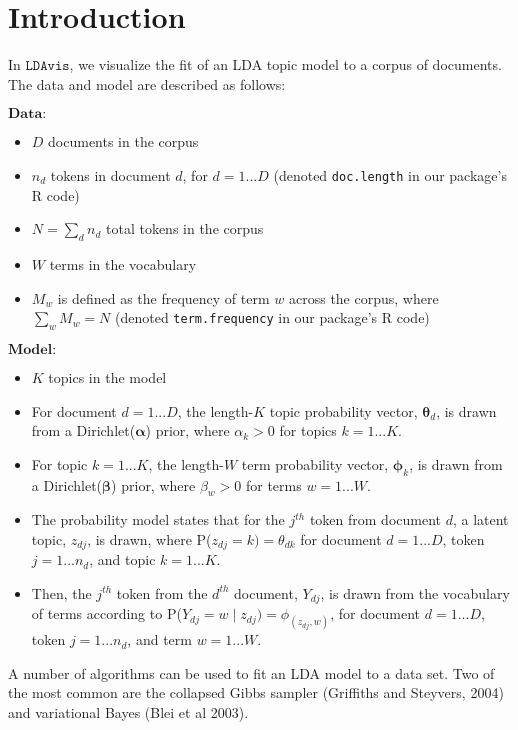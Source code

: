 \documentclass[12pt]{article}
\begin{document}



\section{Introduction}
In $\texttt{LDAvis}$, we visualize the fit of an LDA topic model to a corpus of documents. The data and model are described as follows:

$\textbf{Data:}$
\begin{itemize}
\item $D$ documents in the corpus
\item $n_d$ tokens in document $d$, for $d = 1...D$ (denoted \texttt{doc.length} in our package's R code)
\item $N = \sum_d n_d$ total tokens in the corpus
\item $W$ terms in the vocabulary
\item $M_w$ is defined as the frequency of term $w$ across the corpus, where $\sum_w M_w = N$  (denoted \texttt{term.frequency} in our package's R code)
\end{itemize}

$\textbf{Model:}$
\begin{itemize}
\item $K$ topics in the model
\item For document $d = 1...D$, the length-$K$ topic probability vector, $\boldsymbol{\theta}_d$, is drawn from a Dirichlet($\boldsymbol{\alpha}$) prior, where $\alpha_k > 0$ for topics $k = 1...K$.
\item For topic $k = 1...K$, the length-$W$ term probability vector, $\boldsymbol{\phi}_k$, is drawn from a Dirichlet($\boldsymbol{\beta}$) prior, where $\beta_w > 0$ for terms $w = 1...W$.
\item The probability model states that for the $j^{th}$ token from document $d$, a latent topic, $z_{dj}$, is drawn, where P($z_{dj} = k) = \theta_{dk}$ for document $d = 1...D$, token $j = 1...n_d$, and topic $k = 1...K$.
\item Then, the $j^{th}$ token from the $d^{th}$ document, $Y_{dj}$, is drawn from the vocabulary of terms according to P($Y_{dj} = w \mid z_{dj}) = \phi_{(z_{dj},w)}$, for document $d = 1...D$, token $j = 1...n_d$, and term $w = 1...W$.
\end{itemize}
A number of algorithms can be used to fit an LDA model to a data set. Two of the most common are the collapsed Gibbs sampler (Griffiths and Steyvers, 2004) and variational Bayes (Blei et al 2003).
\end{document}
